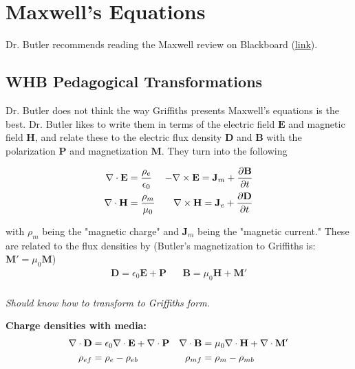 
\section{Maxwell's Equations}
Dr. Butler recommends reading the Maxwell review on Blackboard (\href{https://ualearn.blackboard.com/bbcswebdav/pid-3974540-dt-content-rid-36341461_1/courses/11111.201910/Reading\%20Assingnments/Review\%20of\%20Maxwell\%27s\%20Equations\%281\%29.pdf}{link}).


\subsection{WHB Pedagogical Transformations}
Dr. Butler does not think the way Griffiths presents Maxwell's equations is the best. Dr. Butler likes to write them in terms of the electric field $\mathbf{E}$ and magnetic field $\mathbf{H}$, and relate these to the electric flux density $\mathbf{D}$ and $\mathbf{B}$ with the polarization $\mathbf{P}$ and magnetization $\mathbf{M}$. They turn into the following

    \begin{align*}
        \nabla \cdot \mathbf{E} &= \frac{\rho_e}{\epsilon_0} & -\nabla \times \mathbf{E} = \mathbf{J}_m + \frac{\partial \mathbf{B}}{\partial t} \\
        \nabla \cdot \mathbf{H} &= \frac{\rho_m}{\mu_0} & \nabla \times \mathbf{H} = \mathbf{J}_e + \frac{\partial \mathbf{D}}{\partial t}
    \end{align*}
    
with $\rho_m$ being the "magnetic charge" and $\mathbf{J}_m$ being the "magnetic current." These are related to the flux densities by (Butler's magnetization to Griffiths is: $\mathbf{M}'=\mu_0 \mathbf{M}$)
    \begin{align*}
        \mathbf{D} = \epsilon_0 \mathbf{E} + \mathbf{P} \hspace{20pt}    \mathbf{B} = \mu_0 \mathbf{H} + \mathbf{M}' \\
    \end{align*}
    
\emph{Should know how to transform to Griffiths form.}

\textbf{Charge densities with media:}
    \begin{align*}
        \nabla \cdot \mathbf{D} &=  \epsilon_0 \nabla \cdot \mathbf{E} + \nabla \cdot \mathbf{P} & \nabla \cdot \mathbf{B} &= \mu_0 \nabla \cdot \mathbf{H} + \nabla \cdot \mathbf{M}' \\
        \rho_{ef} &= \rho_e - \rho_{eb} & \rho_{mf} &= \rho_m - \rho_{mb} 
    \end{align*}
    

